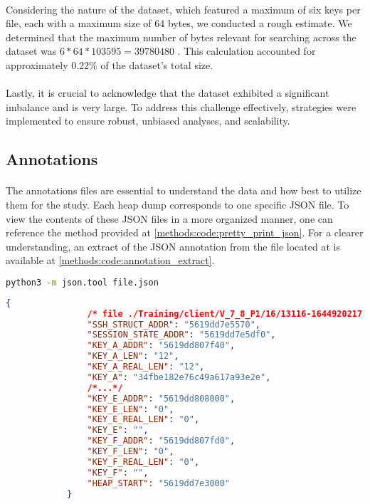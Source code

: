             \paragraph{}Considering the nature of the dataset, which featured a maximum of six keys per file, each with a maximum size of 64 bytes, we conducted a rough estimate. We determined that the maximum number of bytes relevant for searching across the dataset was $6 * 64 * 103595 = 39 780 480$ . This calculation accounted for approximately 0.22\% of the dataset's total size.

            \paragraph{}Lastly, it is crucial to acknowledge that the dataset exhibited a significant imbalance and is very large. To address this challenge effectively, strategies were implemented to ensure robust, unbiased analyses, and scalability.
        \subsection*{Annotations}
            \paragraph{}The annotations files are essential to understand the data and how best to utilize them for the study. Each heap dump corresponds to one specific JSON file. To view the contents of these JSON files in a more organized manner, one can reference the method provided at \ref{methods:code:pretty_print_json}. For a clearer understanding, an extract of the JSON annotation from the file located at  is available at \ref{methods:code:annotation_extract}.

            \begin{lstlisting}[caption={pretty print JSON}, label=methods:code:pretty_print_json, language=bash]
                python3 -m json.tool file.json
            \end{lstlisting}
            \begin{lstlisting}[language=json, caption={An extract of the JSON annotations}, label=methods:code:annotation_extract]
            {
                /* file ./Training/client/V_7_8_P1/16/13116-1644920217.json*/
                "SSH_STRUCT_ADDR": "5619dd7e5570",
                "SESSION_STATE_ADDR": "5619dd7e5df0",
                "KEY_A_ADDR": "5619dd807f40",
                "KEY_A_LEN": "12",
                "KEY_A_REAL_LEN": "12",
                "KEY_A": "34fbe182e76c49a617a93e2e",
                /*...*/
                "KEY_E_ADDR": "5619dd808000",
                "KEY_E_LEN": "0",
                "KEY_E_REAL_LEN": "0",
                "KEY_E": "",
                "KEY_F_ADDR": "5619dd807fd0",
                "KEY_F_LEN": "0",
                "KEY_F_REAL_LEN": "0",
                "KEY_F": "",
                "HEAP_START": "5619dd7e3000"
            }
            \end{lstlisting}

